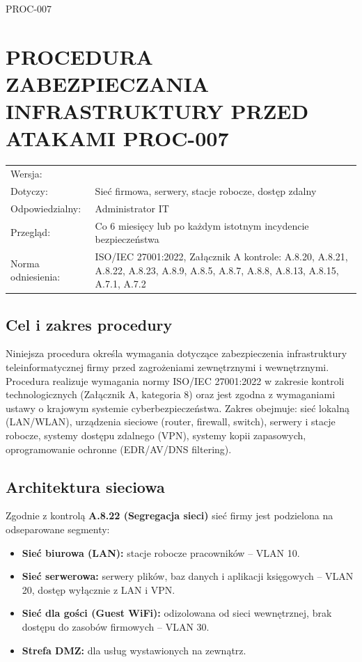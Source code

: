 \documentclass[12pt,a4paper]{article}
\providecommand{\tightlist}{\setlength{\itemsep}{0pt}\setlength{\parskip}{0pt}}
\begin{document}
\label{doc4}
PROC-007

\section{PROCEDURA ZABEZPIECZANIA INFRASTRUKTURY PRZED
ATAKAMI PROC-007}\label{procedura-zabezpieczania-infrastruktury-przed-atakami}

\begin{longtable}{@{}>{\raggedright\arraybackslash}p{}>{\raggedright\arraybackslash}p{}@{}}
\toprule\noalign{}
\endhead
\bottomrule\noalign{}
\endlastfoot
Wersja: & 1.0 \\
Dotyczy: & Sieć firmowa, serwery, stacje robocze, dostęp zdalny \\
Odpowiedzialny: & Administrator IT \\
Przegląd: & Co 6 miesięcy lub po każdym istotnym incydencie bezpieczeństwa \\
Norma odniesienia: & ISO/IEC 27001:2022, Załącznik A kontrole: A.8.20, A.8.21, A.8.22, A.8.23, A.8.9, A.8.5, A.8.7, A.8.8, A.8.13, A.8.15, A.7.1, A.7.2 \\
\end{longtable}

\subsection{Cel i zakres procedury}\label{cel-i-zakres-procedury}

Niniejsza procedura określa wymagania dotyczące zabezpieczenia infrastruktury teleinformatycznej firmy przed zagrożeniami zewnętrznymi i wewnętrznymi. Procedura realizuje wymagania normy ISO/IEC 27001:2022 w zakresie kontroli technologicznych (Załącznik A, kategoria 8) oraz jest zgodna z wymaganiami ustawy o krajowym systemie cyberbezpieczeństwa. Zakres obejmuje: sieć lokalną (LAN/WLAN), urządzenia sieciowe (router, firewall, switch), serwery i stacje robocze, systemy dostępu zdalnego (VPN), systemy kopii zapasowych, oprogramowanie ochronne (EDR/AV/DNS filtering).



\subsection{Architektura sieciowa}\label{architektura-sieciowa}

Zgodnie z kontrolą \textbf{A.8.22 (Segregacja sieci)} sieć firmy jest podzielona na odseparowane segmenty:
\begin{itemize}
\tightlist
\item
  \textbf{Sieć biurowa (LAN):} stacje robocze pracowników -- VLAN 10.
\item
  \textbf{Sieć serwerowa:} serwery plików, baz danych i aplikacji księgowych -- VLAN 20, dostęp wyłącznie z LAN i VPN.
\item
  \textbf{Sieć dla gości (Guest WiFi):} odizolowana od sieci wewnętrznej, brak dostępu do zasobów firmowych -- VLAN 30.
\item
  \textbf{Strefa DMZ:} dla usług wystawionych na zewnątrz.
\end{itemize}
\end{document}
